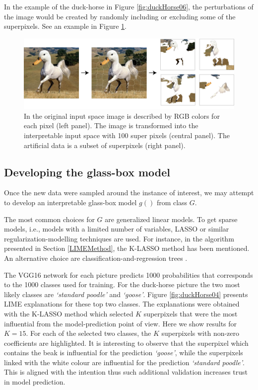 \documentclass[]{krantz}
\begin{document}
In the example of the duck-horse in Figure \ref{fig:duckHorse06}, the perturbations of the image would be created by randomly including or excluding some of the superpixels.
See an example in Figure \ref{fig:duckHorseProcess}.

\begin{figure}

{\centering \includegraphics[width=1\linewidth]{figure/duck_horse_process} 

}

\caption{In the original input space image is described by RGB colors for each pixel (left panel). The image is transformed into the interpretable input space with 100 super pixels (central panel). The artificial data is a subset of superpixels (right panel).}\label{fig:duckHorseProcess}
\end{figure}

\hypertarget{developing-the-glass-box-model}{%
\subsection{Developing the glass-box model}\label{developing-the-glass-box-model}}

Once the new data were sampled around the instance of interest, we may attempt to develop an interpretable glass-box model \(g()\) from class \(G\).

The most common choices for \(G\) are generalized linear models. To get sparse models, i.e., models with a limited number of variables, LASSO \citep{Tibshirani94regressionshrinkage} or similar regularization-modelling techniques are used. For instance, in the algorithm presented in Section \ref{LIMEMethod}, the K-LASSO method has been mentioned. An alternative choice are classification-and-regression trees \citep{CARTtree}.

The VGG16 network for each picture predicts 1000 probabilities that corresponds to the 1000 classes used for training.
For the duck-horse picture the two most likely classes are \emph{`standard poodle'} and \emph{`goose'}.
Figure \ref{fig:duckHorse04} presents LIME explanations for these top two classes. The explanations were obtained with the K-LASSO method which selected \(K\) superpixels that were the most influential from the model-prediction point of view. Here we show results for \(K=15\). For each of the selected two classes, the \(K\) superpixels with non-zero coefficients are highlighted. It is interesting to observe that the superpixel which contains the beak is influential for the prediction \emph{`goose'}, while the superpixels linked with the white colour are influential for the prediction \emph{`standard poodle'}. This is aligned with the intention thus such additional validation increases trust in model prediction.
\end{document}

